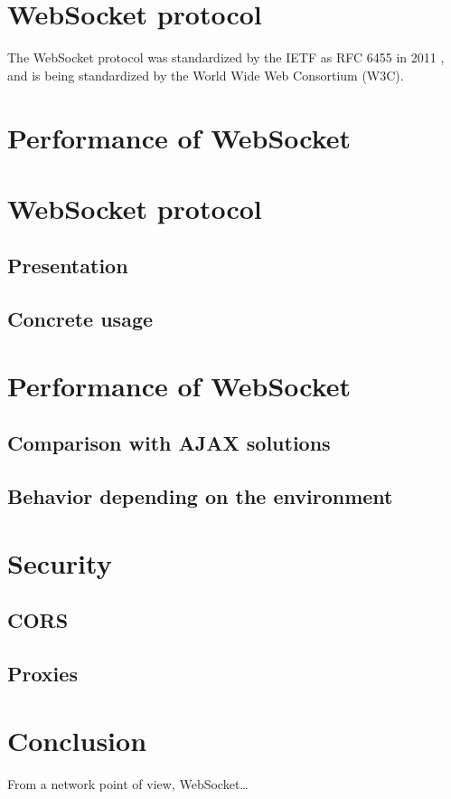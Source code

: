 \documentclass[journal,compsoc]{IEEEtran}
\newcommand{\ws}{WebSocket}
\begin{document}
\section{\ws{} protocol}
The \ws{} protocol was standardized by the IETF as RFC 6455 in 2011 \cite{rfc6455}, and is being standardized by the World Wide Web Consortium (W3C).



\section{Performance of WebSocket}


\section{\ws{} protocol}



\subsection{Presentation}

\subsection{Concrete usage}

\section{Performance of \ws}

\subsection{Comparison with AJAX solutions}

\subsection{Behavior depending on the environment}

\section{Security}

\subsection{CORS}

\subsection{Proxies}

\section{Conclusion}

From a network point of view, \ws …


\ifCLASSOPTIONcaptionsoff
  \newpage
\fi




\end{document}
